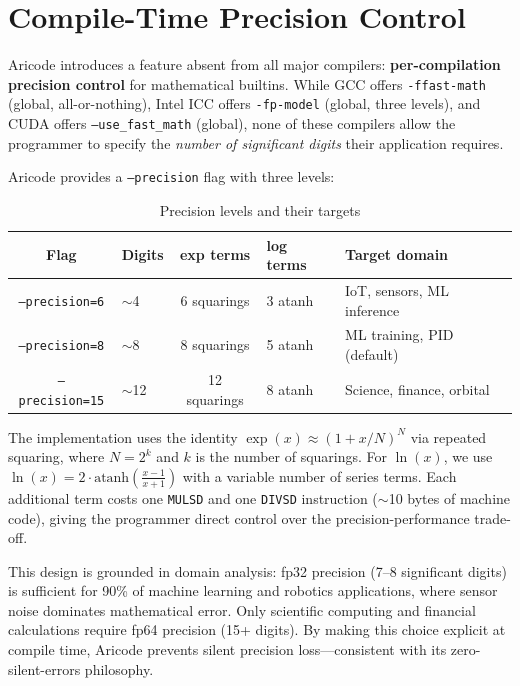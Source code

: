 \documentclass[11pt,a4paper]{article}
\begin{document}
\section{Compile-Time Precision Control}
\label{sec:precision}

Aricode introduces a feature absent from all major compilers: \textbf{per-compilation precision control} for mathematical builtins. While GCC offers \texttt{-ffast-math} (global, all-or-nothing), Intel ICC offers \texttt{-fp-model} (global, three levels), and CUDA offers \texttt{--use\_fast\_math} (global), none of these compilers allow the programmer to specify the \emph{number of significant digits} their application requires.

Aricode provides a \texttt{--precision} flag with three levels:

\begin{table}[H]
\centering
\caption{Precision levels and their targets}
\label{tab:precision}
\begin{tabular}{@{}clcll@{}}
\toprule
\textbf{Flag} & \textbf{Digits} & \textbf{exp terms} & \textbf{log terms} & \textbf{Target domain} \\
\midrule
\texttt{--precision=6}  & $\sim$4  & 6 squarings  & 3 atanh & IoT, sensors, ML inference \\
\texttt{--precision=8}  & $\sim$8  & 8 squarings  & 5 atanh & ML training, PID (default) \\
\texttt{--precision=15} & $\sim$12 & 12 squarings & 8 atanh & Science, finance, orbital \\
\bottomrule
\end{tabular}
\end{table}

The implementation uses the identity $\exp(x) \approx (1 + x/N)^N$ via repeated squaring, where $N = 2^k$ and $k$ is the number of squarings. For $\ln(x)$, we use $\ln(x) = 2 \cdot \text{atanh}(\frac{x-1}{x+1})$ with a variable number of series terms. Each additional term costs one \texttt{MULSD} and one \texttt{DIVSD} instruction ($\sim$10 bytes of machine code), giving the programmer direct control over the precision-performance trade-off.

This design is grounded in domain analysis: fp32 precision (7--8 significant digits) is sufficient for 90\% of machine learning and robotics applications, where sensor noise dominates mathematical error. Only scientific computing and financial calculations require fp64 precision (15+ digits). By making this choice explicit at compile time, Aricode prevents silent precision loss---consistent with its zero-silent-errors philosophy.
\end{document}
